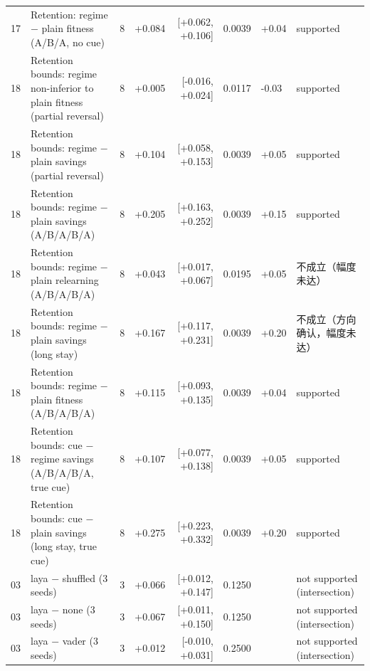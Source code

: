 \begin{table}[t]
{\begin{tabular}{@{}llrrrrll@{}}
17 & Retention: regime $-$ plain fitness (A/B/A, no cue) & 8 & +0.084 & [+0.062, +0.106] & 0.0039 & +0.04 & supported \\
18 & Retention bounds: regime non-inferior to plain fitness (partial reversal) & 8 & +0.005 & [-0.016, +0.024] & 0.0117 & -0.03 & supported \\
18 & Retention bounds: regime $-$ plain savings (partial reversal) & 8 & +0.104 & [+0.058, +0.153] & 0.0039 & +0.05 & supported \\
18 & Retention bounds: regime $-$ plain savings (A/B/A/B/A) & 8 & +0.205 & [+0.163, +0.252] & 0.0039 & +0.15 & supported \\
18 & Retention bounds: regime $-$ plain relearning (A/B/A/B/A) & 8 & +0.043 & [+0.017, +0.067] & 0.0195 & +0.05 & 不成立（幅度未达） \\
18 & Retention bounds: regime $-$ plain savings (long stay) & 8 & +0.167 & [+0.117, +0.231] & 0.0039 & +0.20 & 不成立（方向确认，幅度未达） \\
18 & Retention bounds: regime $-$ plain fitness (A/B/A/B/A) & 8 & +0.115 & [+0.093, +0.135] & 0.0039 & +0.04 & supported \\
18 & Retention bounds: cue $-$ regime savings (A/B/A/B/A, true cue) & 8 & +0.107 & [+0.077, +0.138] & 0.0039 & +0.05 & supported \\
18 & Retention bounds: cue $-$ plain savings (long stay, true cue) & 8 & +0.275 & [+0.223, +0.332] & 0.0039 & +0.20 & supported \\
03 & laya $-$ shuffled (3 seeds) & 3 & +0.066 & [+0.012, +0.147] & 0.1250 &  & not supported (intersection) \\
03 & laya $-$ none (3 seeds) & 3 & +0.067 & [+0.011, +0.150] & 0.1250 &  & not supported (intersection) \\
03 & laya $-$ vader (3 seeds) & 3 & +0.012 & [-0.010, +0.031] & 0.2500 &  & not supported (intersection) \\
\bottomrule\end{tabular}}\end{table}

